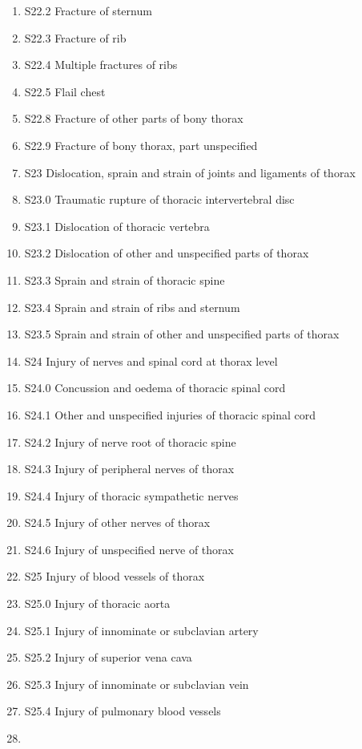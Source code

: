 \documentclass[
]{scrartcl}
\begin{document}
\begin{itemize}
\begin{enumerate}
  \item
    S22.2 Fracture of sternum
  \item
    S22.3 Fracture of rib
  \item
    S22.4 Multiple fractures of ribs
  \item
    S22.5 Flail chest
  \item
    S22.8 Fracture of other parts of bony thorax
  \item
    S22.9 Fracture of bony thorax, part unspecified
  \item
    S23 Dislocation, sprain and strain of joints and ligaments of thorax
  \item
    S23.0 Traumatic rupture of thoracic intervertebral disc
  \item
    S23.1 Dislocation of thoracic vertebra
  \item
    S23.2 Dislocation of other and unspecified parts of thorax
  \item
    S23.3 Sprain and strain of thoracic spine
  \item
    S23.4 Sprain and strain of ribs and sternum
  \item
    S23.5 Sprain and strain of other and unspecified parts of thorax
  \item
    S24 Injury of nerves and spinal cord at thorax level
  \item
    S24.0 Concussion and oedema of thoracic spinal cord
  \item
    S24.1 Other and unspecified injuries of thoracic spinal cord
  \item
    S24.2 Injury of nerve root of thoracic spine
  \item
    S24.3 Injury of peripheral nerves of thorax
  \item
    S24.4 Injury of thoracic sympathetic nerves
  \item
    S24.5 Injury of other nerves of thorax
  \item
    S24.6 Injury of unspecified nerve of thorax
  \item
    S25 Injury of blood vessels of thorax
  \item
    S25.0 Injury of thoracic aorta
  \item
    S25.1 Injury of innominate or subclavian artery
  \item
    S25.2 Injury of superior vena cava
  \item
    S25.3 Injury of innominate or subclavian vein
  \item
    S25.4 Injury of pulmonary blood vessels
  \item

\end{enumerate}
\end{itemize}
\end{document}
